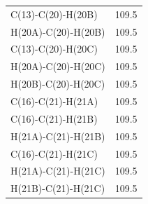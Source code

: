 \begin{center}
{\begin{supertabular}{p{1.5in}c}
C(13)-C(20)-H(20B)&109.5\\
H(20A)-C(20)-H(20B)&109.5\\
C(13)-C(20)-H(20C)&109.5\\
H(20A)-C(20)-H(20C)&109.5\\
H(20B)-C(20)-H(20C)&109.5\\
C(16)-C(21)-H(21A)&109.5\\
C(16)-C(21)-H(21B)&109.5\\
H(21A)-C(21)-H(21B)&109.5\\
C(16)-C(21)-H(21C)&109.5\\
H(21A)-C(21)-H(21C)&109.5\\
H(21B)-C(21)-H(21C)&109.5\\
\end{supertabular}
}
\end{center}

